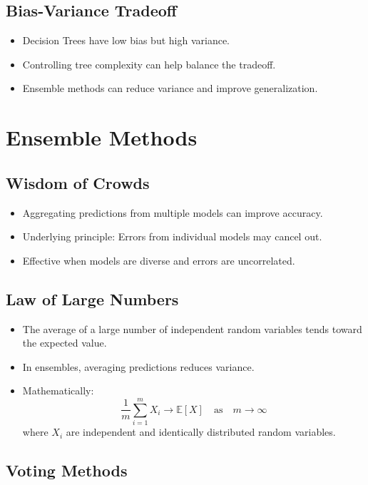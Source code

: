 \documentclass{article}
\begin{document}
\subsection{Bias-Variance Tradeoff}

\begin{itemize}
    \item Decision Trees have low bias but high variance.
    \item Controlling tree complexity can help balance the tradeoff.
    \item Ensemble methods can reduce variance and improve generalization.
\end{itemize}

\section{Ensemble Methods}

\subsection{Wisdom of Crowds}

\begin{itemize}
    \item Aggregating predictions from multiple models can improve accuracy.
    \item Underlying principle: Errors from individual models may cancel out.
    \item Effective when models are diverse and errors are uncorrelated.
\end{itemize}

\subsection{Law of Large Numbers}

\begin{itemize}
    \item The average of a large number of independent random variables tends toward the expected value.
    \item In ensembles, averaging predictions reduces variance.
    \item Mathematically:
    \[
    \frac{1}{m} \sum_{i=1}^{m} X_{i} \rightarrow \mathbb{E}[X] \quad \text{as} \quad m \rightarrow \infty
    \]
    where \( X_{i} \) are independent and identically distributed random variables.
\end{itemize}

\subsection{Voting Methods}
\end{document}
